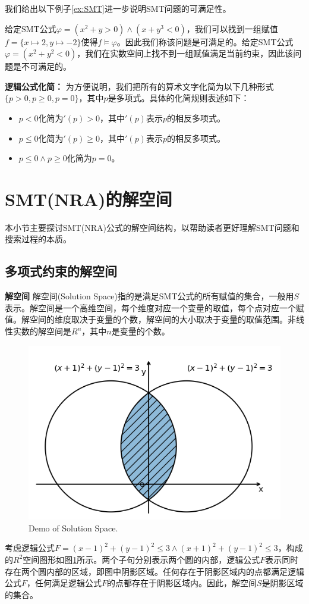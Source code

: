 我们给出以下例子\ref{ex:SMT}进一步说明SMT问题的可满足性。

\begin{example}
\label{ex:SMT}
给定SMT公式$\varphi = (x^2 + y > 0) \wedge (x + y^3 < 0)$，我们可以找到一组赋值$f = \{x \mapsto 2, y \mapsto -2\}$使得$f \models \varphi$。因此我们称该问题是可满足的。给定SMT公式$\varphi = (x^2 + y^2 < 0)$，我们在实数空间上找不到一组赋值满足当前约束，因此该问题是不可满足的。
\end{example}


\textbf{逻辑公式化简：} 为方便说明，我们把所有的算术文字化简为以下几种形式$\{p > 0, p \geq 0, p = 0\}$，其中$p$是多项式。具体的化简规则表述如下：
\begin{itemize}
    \item $p < 0$化简为$\prime(p) > 0$，其中$\prime(p)$表示$p$的相反多项式。
    \item $p \leq 0$化简为$\prime(p) \geq 0$，其中$\prime(p)$表示$p$的相反多项式。
    \item $p \leq 0 \wedge p \geq 0$化简为$p = 0$。
\end{itemize}


\section{SMT(NRA)的解空间}
本小节主要探讨SMT(NRA)公式的解空间结构，以帮助读者更好理解SMT问题和搜索过程的本质。
\subsection{多项式约束的解空间}
\begin{definition}{\textbf{解空间}}
解空间(Solution Space)指的是满足SMT公式的所有赋值的集合，一般用$S$表示。解空间是一个高维空间，每个维度对应一个变量的取值，每个点对应一个赋值。解空间的维度取决于变量的个数，解空间的大小取决于变量的取值范围。非线性实数的解空间是$R^n$，其中$n$是变量的个数。
\end{definition}
\begin{example}
    \begin{figure}[]
        \centering
        \includegraphics[width=0.4\columnwidth]{Img/cell1.png}
         {Demo of Solution Space.}
        \label{fig:solution_space}
    \end{figure}
    
    考虑逻辑公式$F = (x - 1)^2 + (y - 1)^2 \le 3 \wedge (x + 1)^2 + (y - 1)^2 \le 3$，构成的$R^2$空间图形如图\ref{fig:solution_space}所示。两个子句分别表示两个圆的内部，逻辑公式$F$表示同时存在两个圆内部的区域，即图中阴影区域。任何存在于阴影区域内的点都满足逻辑公式$F$，任何满足逻辑公式$F$的点都存在于阴影区域内。因此，解空间$S$是阴影区域的集合。
\label{ex:solution_space}
\end{example}
    
